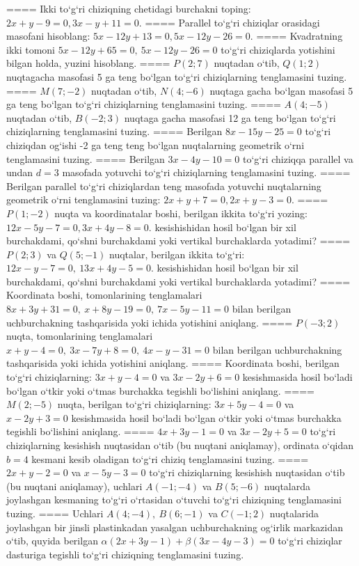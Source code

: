 ====
Ikki to‘g‘ri chiziqning chetidagi burchakni toping: $2x+y-9=0, 3x-y+11=0$.
====
Parallel to‘g‘ri chiziqlar orasidagi masofani hisoblang: $5x-12y+13=0, 5x-12y-26=0$.
====
Kvadratning ikki tomoni
\(5x-12y+65=0,\ 5x-12y-26=0\) to‘g‘ri chiziqlarda
yotishini bilgan holda, yuzini hisoblang.
====
\(P (2;7) \) nuqtadan o‘tib, \(Q (1;2) \) nuqtagacha
masofasi 5 ga teng bo‘lgan to‘g‘ri chiziqlarning tenglamasini tuzing.
====
\(M (7;-2) \) nuqtadan o‘tib, \(N (4;-6) \) nuqtaga
gacha bo‘lgan masofasi 5 ga teng bo‘lgan to‘g‘ri chiziqlarning tenglamasini tuzing.
====
\(A (4;-5) \) nuqtadan o‘tib, \(B (-2;3) \) nuqtaga
gacha masofasi 12 ga teng bo‘lgan to‘g‘ri chiziqlarning tenglamasini tuzing.
====
Berilgan \(8x-15y-25=0\) to‘g‘ri chiziqdan og‘ishi -2 ga teng
teng bo‘lgan nuqtalarning geometrik o‘rni tenglamasini tuzing.
====
Berilgan \(3x-4y-10=0\) to‘g‘ri chiziqqa parallel va undan
$d=3$ masofada yotuvchi to‘g‘ri chiziqlarning tenglamasini tuzing.
====
Berilgan parallel to‘g‘ri chiziqlardan teng masofada yotuvchi
nuqtalarning geometrik o‘rni tenglamasini tuzing: $2x+y+7=0, 2x+y-3=0$.
====
\(P (1;-2) \) nuqta va koordinatalar boshi, berilgan ikkita
to‘g‘ri yozing: $12x-5y-7=0, 3x+4y-8=0$.
kesishishidan hosil bo‘lgan bir xil burchakdami, qo‘shni burchakdami yoki vertikal
burchaklarda yotadimi?
====
\(P (2;3) \) va \(Q (5;-1) \) nuqtalar, berilgan ikkita
to‘g‘ri: $12x-y-7=0,\ 13x+4y-5=0$.
kesishishidan hosil bo‘lgan bir xil burchakdami, qo‘shni burchakdami yoki vertikal
burchaklarda yotadimi?
====
Koordinata boshi, tomonlarining tenglamalari
\(8x+3y+31=0,\ x+8y-19=0,\ 7x-5y-11=0\) bilan
berilgan uchburchakning tashqarisida yoki ichida yotishini aniqlang.
====
\(P (-3;2) \) nuqta, tomonlarining tenglamalari
\(x+y-4=0,\ 3x-7y+8=0,\ 4x-y-31=0\) bilan
berilgan uchburchakning tashqarisida yoki ichida yotishini aniqlang.
====
Koordinata boshi, berilgan to‘g‘ri chiziqlarning:
\(3x+y-4=0\) va \(3x-2y+6=0\) kesishmasida hosil bo‘ladi
bo‘lgan o‘tkir yoki o‘tmas burchakka tegishli bo‘lishini aniqlang.
====
\(M (2;-5) \) nuqta, berilgan to‘g‘ri chiziqlarning:
\(3x+5y-4=0\) va \(x-2y+3=0\) kesishmasida hosil bo‘ladi
bo‘lgan o‘tkir yoki o‘tmas burchakka tegishli bo‘lishini aniqlang.
====
\(4x+3y-1=0\) va \(3x-2y+5=0\)
to‘g‘ri chiziqlarning kesishish nuqtasidan o‘tib (bu nuqtani aniqlamay), ordinata
o‘qidan \(b=4\) kesmani kesib oladigan to‘g‘ri chiziq tenglamasini tuzing.
====
\(2x+y-2=0\) va \(x-5y-3=0\)
to‘g‘ri chiziqlarning kesishish nuqtasidan o‘tib (bu nuqtani aniqlamay), uchlari
\(A (-1;-4) \) va \(B (5;-6) \) nuqtalarda joylashgan kesmaning
to‘g‘ri o‘rtasidan o‘tuvchi to‘g‘ri chiziqning tenglamasini tuzing.
====
Uchlari \(A (4;-4),\ B (6;-1) \) va \(C (-1;2) \)
nuqtalarida joylashgan bir jinsli plastinkadan yasalgan uchburchakning
og‘irlik markazidan o‘tib, quyida berilgan
\(\alpha (2x+3y-1) +\beta (3x-4y-3) =0\) to‘g‘ri chiziqlar dasturiga
tegishli to‘g‘ri chiziqning tenglamasini tuzing.